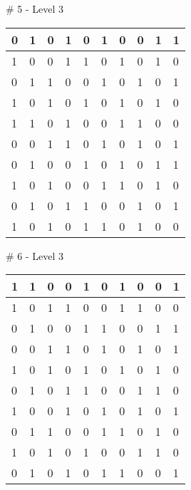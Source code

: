 \smallskip

\# 5 - Level 3 \newline
\begin{tabular}{|m{\collen}|m{\collen}|m{\collen}|m{\collen}|m{\collen}|m{\collen}|m{\collen}|m{\collen}|m{\collen}|m{\collen}|}
\hline
  0 & 1 & 0 & 1 & 0 & 1 & 0 & 0 & 1 & 1 \\
\hline
  1 & 0 & 0 & 1 & 1 & 0 & 1 & 0 & 1 & 0 \\
\hline
  0 & 1 & 1 & 0 & 0 & 1 & 0 & 1 & 0 & 1 \\
\hline
  1 & 0 & 1 & 0 & 1 & 0 & 1 & 0 & 1 & 0 \\
\hline
  1 & 1 & 0 & 1 & 0 & 0 & 1 & 1 & 0 & 0 \\
\hline
  0 & 0 & 1 & 1 & 0 & 1 & 0 & 1 & 0 & 1 \\
\hline
  0 & 1 & 0 & 0 & 1 & 0 & 1 & 0 & 1 & 1 \\
\hline
  1 & 0 & 1 & 0 & 0 & 1 & 1 & 0 & 1 & 0 \\
\hline
  0 & 1 & 0 & 1 & 1 & 0 & 0 & 1 & 0 & 1 \\
\hline
  1 & 0 & 1 & 0 & 1 & 1 & 0 & 1 & 0 & 0 \\
\hline
\end{tabular}


\smallskip

\# 6 - Level 3 \newline
\begin{tabular}{|m{\collen}|m{\collen}|m{\collen}|m{\collen}|m{\collen}|m{\collen}|m{\collen}|m{\collen}|m{\collen}|m{\collen}|}
\hline
  1 & 1 & 0 & 0 & 1 & 0 & 1 & 0 & 0 & 1 \\
\hline
  1 & 0 & 1 & 1 & 0 & 0 & 1 & 1 & 0 & 0 \\
\hline
  0 & 1 & 0 & 0 & 1 & 1 & 0 & 0 & 1 & 1 \\
\hline
  0 & 0 & 1 & 1 & 0 & 1 & 0 & 1 & 0 & 1 \\
\hline
  1 & 0 & 1 & 0 & 1 & 0 & 1 & 0 & 1 & 0 \\
\hline
  0 & 1 & 0 & 1 & 1 & 0 & 0 & 1 & 1 & 0 \\
\hline
  1 & 0 & 0 & 1 & 0 & 1 & 0 & 1 & 0 & 1 \\
\hline
  0 & 1 & 1 & 0 & 0 & 1 & 1 & 0 & 1 & 0 \\
\hline
  1 & 0 & 1 & 0 & 1 & 0 & 0 & 1 & 1 & 0 \\
\hline
  0 & 1 & 0 & 1 & 0 & 1 & 1 & 0 & 0 & 1 \\
\hline
\end{tabular}


\smallskip

